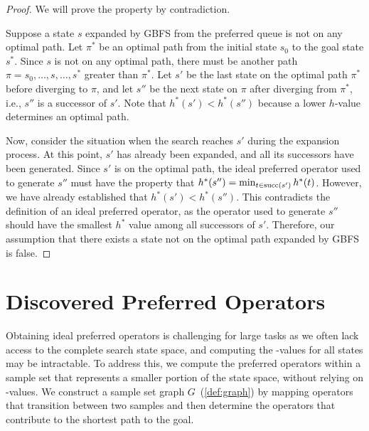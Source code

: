 \documentclass[ppgc,diss,english]{iiufrgs}
\begin{document}
\begin{proof}
We will prove the property by contradiction.

Suppose a state $s$ expanded by GBFS from the preferred queue is not on any optimal path.
Let $\pi^*$ be an optimal path from the initial state $s_0$ to the goal state $s^*$. Since $s$ is not on any optimal path, there must be another path $\pi = s_0,\ldots,s,\ldots,s^*$ greater than $\pi^*$.
Let $s'$ be the last state on the optimal path $\pi^*$ before diverging to $\pi$, and let $s''$ be the next state on $\pi$ after diverging from $\pi^*$, i.e., $s''$ is a successor of $s'$. Note that $h^*(s') < h^*(s'')$ because a lower $h$-value determines an optimal path.

Now, consider the situation when the search reaches $s'$ during the expansion process. At this point, $s'$ has already been expanded, and all its successors have been generated. Since $s'$ is on the optimal path, the ideal preferred operator used to generate $s''$ must have the property that $h^*(s'') = \min_{t \in \operatorname{succ}(s')} h^*{(t)}$. However, we have already established that $h^*(s') < h^*(s'')$. This contradicts the definition of an ideal preferred operator, as the operator used to generate $s''$ should have the smallest $h^*$ value among all successors of $s'$. Therefore, our assumption that there exists a state not on the optimal path expanded by GBFS is false.


\end{proof}

\section{Discovered Preferred Operators}
\label{sec:sample-discovered-po}
Obtaining ideal preferred operators is challenging for large tasks as we often lack access to the complete search state space, and computing the \hstar-values for all states may be intractable. To address this, we compute the preferred operators within a sample set that represents a smaller portion of the state space, without relying on \hstar-values. We construct a sample set graph $G$~(\cref{def:graph}) by mapping operators that transition between two samples and then determine the operators that contribute to the shortest path to the goal.
\end{document}
